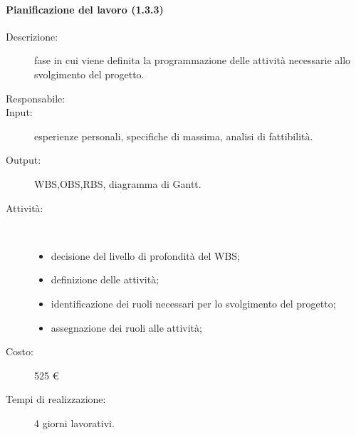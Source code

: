 \paragraph{Pianificazione del lavoro (1.3.3)}
\begin{description}
\item[Descrizione:] fase in cui viene definita la programmazione delle attivit\`{a} necessarie allo svolgimento del progetto.
\item[Responsabile:] 
\item[Input:] esperienze personali, specifiche di massima, analisi di fattibilit\`{a}.
\item[Output:] WBS,OBS,RBS, diagramma di Gantt.
\item[Attività:]\mbox{}\\[-1.5\baselineskip]
	\begin{itemize}
	\item decisione del livello di profondit\`{a} del WBS;
	\item definizione delle attivit\`{a};
	\item identificazione dei ruoli necessari per lo svolgimento del progetto;
	\item assegnazione dei ruoli alle attivit\`{a};
	\end{itemize}
\item[Costo:] 525 \euro{}
\item[Tempi di realizzazione:] 4 giorni lavorativi.
\end{description}

